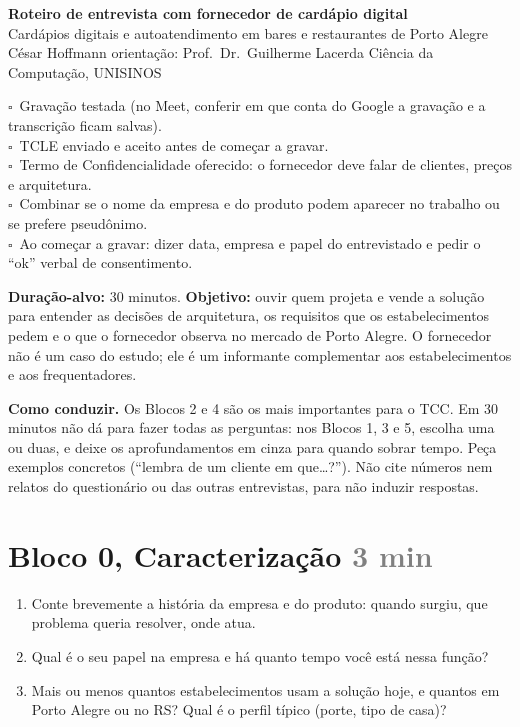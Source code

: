 \documentclass[11pt,a4paper]{article}
\newcommand{\bloco}[2]{\section*{#1 \hfill{\normalsize\textcolor{gray}{#2}}}}
\newcommand{\caixa}{$\square$\ }
\begin{document}
\begin{center}
  {\Large\bfseries Roteiro de entrevista com fornecedor de cardápio digital}\\[0.4em]
  Cardápios digitais e autoatendimento em bares e restaurantes de Porto Alegre\\[0.2em]
  {\small César Hoffmann \textbullet{} orientação: Prof.\ Dr.\ Guilherme Lacerda \textbullet{} Ciência da Computação, UNISINOS}
\end{center}

\begin{tcolorbox}[colback=gray!6,colframe=gray!50,title=Antes de começar,fonttitle=\bfseries]
\caixa Gravação testada (no Meet, conferir em que conta do Google a gravação e a transcrição ficam salvas).\\
\caixa TCLE enviado e aceito antes de começar a gravar.\\
\caixa Termo de Confidencialidade oferecido: o fornecedor deve falar de clientes, preços e arquitetura.\\
\caixa Combinar se o nome da empresa e do produto podem aparecer no trabalho ou se prefere pseudônimo.\\
\caixa Ao começar a gravar: dizer data, empresa e papel do entrevistado e pedir o ``ok'' verbal de consentimento.
\end{tcolorbox}

\textbf{Duração-alvo:} 30 minutos. \textbf{Objetivo:} ouvir quem projeta e vende a solução para entender as decisões de arquitetura, os requisitos que os estabelecimentos pedem e o que o fornecedor observa no mercado de Porto Alegre. O fornecedor não é um caso do estudo; ele é um informante complementar aos estabelecimentos e aos frequentadores.

\textbf{Como conduzir.} Os Blocos 2 e 4 são os mais importantes para o TCC. Em 30 minutos não dá para fazer todas as perguntas: nos Blocos 1, 3 e 5, escolha uma ou duas, e deixe os aprofundamentos em cinza para quando sobrar tempo. Peça exemplos concretos (``lembra de um cliente em que\ldots?''). Não cite números nem relatos do questionário ou das outras entrevistas, para não induzir respostas.

\bloco{Bloco 0, Caracterização}{3 min}
\begin{enumerate}[series=perguntas]
  \item Conte brevemente a história da empresa e do produto: quando surgiu, que problema queria resolver, onde atua.
  \item Qual é o seu papel na empresa e há quanto tempo você está nessa função?
  \item Mais ou menos quantos estabelecimentos usam a solução hoje, e quantos em Porto Alegre ou no RS? Qual é o perfil típico (porte, tipo de casa)?
\end{enumerate}
\end{document}
